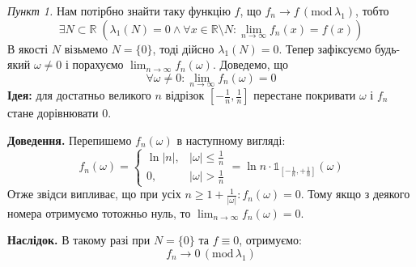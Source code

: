 \documentclass[14pt]{extarticle}
\begin{document}
\textit{Пункт 1.} Нам потірбно знайти таку функцію $f$, що $f_n \to f\,(\text{mod}\,\lambda_1)$, тобто
\[
\exists N \subset \mathbb{R} \; \left(\lambda_1(N) = 0 \wedge \forall x \in \mathbb{R} \setminus N: \lim_{n \to \infty}f_n(x) = f(x)\right)
\]
В якості $N$ візьмемо $N = \{0\}$, тоді дійсно $\lambda_1(N)=0$. Тепер зафіксуємо будь-який $\omega \neq 0$ і порахуємо $\lim_{n \to \infty}f_n(\omega)$. Доведемо, що
\[
\forall \omega \neq 0: \lim_{n \to \infty}f_n(\omega) = 0
\]
\textbf{Ідея:} для достатньо великого $n$ відрізок $[-\frac{1}{n},\frac{1}{n}]$ перестане покривати $\omega$ і $f_n$ стане дорівнювати $0$.

\textbf{Доведення.} Перепишемо $f_n(\omega)$ в наступному вигляді:
\[
f_n(\omega) = \begin{cases}
    \ln|n|, & |\omega| \leq \frac{1}{n} \\
    0, & |\omega| > \frac{1}{n}
\end{cases} = \ln n \cdot \mathds{1}_{[-\frac{1}{n},+\frac{1}{n}]}(\omega)
\]
Отже звідси випливає, що при усіх $n \geq 1+\frac{1}{|\omega|}: f_n(\omega)=0$. Тому якщо з деякого номера отримуємо тотожньо нуль, то $\lim_{n \to \infty}f_n(\omega)=0$. 

\textbf{Наслідок.} В такому разі при $N = \{0\}$ та $f \equiv 0$, отримуємо:
\[
f_n \to 0 \, (\text{mod} \, \lambda_1)
\]
\end{document}
